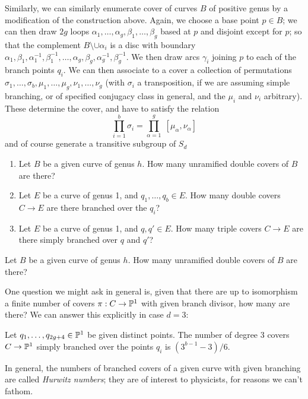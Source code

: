 Similarly, we can similarly enumerate cover of curves $B$ of positive genus by a modification of the construction above. Again, we choose a base point $p \in B$; we can then draw $2g$ loops $\alpha_1,\dots,\alpha_{g},\beta_1, \dots, \beta_g$ based at $p$ and disjoint except for $p$; so that the complement $B \setminus \cup \alpha_i$ is a disc with boundary $\alpha_1, \beta_1, \alpha_1^{-1}, \beta_1^{-1}, \dots, \alpha_g, \beta_g, \alpha_g^{-1}, \beta_g^{-1}$. We then draw arcs $\gamma_i$ joining $p$ to each of the branch points $q_i$. We can then associate to a cover a collection of permutations $\sigma_1, \dots, \sigma_b, \mu_1,\dots,\mu_g, \nu_1,\dots,\nu_g$ (with $\sigma_i$ a transposition, if we are assuming simple branching, or of specified conjugacy class in general, and the $\mu_i$ and $\nu_i$ arbitrary). These determine the cover, and have to satisfy the relation
$$
\prod_{i=1}^b \sigma_i = \prod_{\alpha=1}^g \; [\mu_\alpha, \nu_\alpha]
$$
and of course generate a transitive subgroup of $S_d$

\begin{exercise}
\begin{enumerate}
\item Let $B$ be a given curve of genus $h$. How many unramified double covers of $B$ are there? 
\item Let $E$ be a curve of genus 1, and $q_1,\dots,q_b \in E$. How many double covers $C \to E$ are there branched over the $q_i$?
\item Let $E$ be a curve of genus 1, and $q, q' \in E$. How many triple covers $C \to E$ are there simply branched over $q$ and $q'$?
\end{enumerate}
Let $B$ be a given curve of genus $h$. How many unramified double covers of $B$ are there? 
\end{exercise}


One question we might ask in general is, given that there are up to isomorphism a finite number of covers $\pi : C \to \PP^1$ with given branch divisor, how many are there? We can answer this explicitly in case $d = 3$:

\begin{exercise}
Let $q_1, \dots, q_{2g+4} \in \PP^1$ be given distinct points. The number of degree 3 covers $C \to \PP^1$ simply branched over the  points $q_i$ is $(3^{b-1} - 3)/6$.
\end{exercise}

In general, the numbers of branched covers of a given curve with given branching are called \emph{Hurwitz numbers}; they are of interest to physicists, for reasons we can't fathom.




